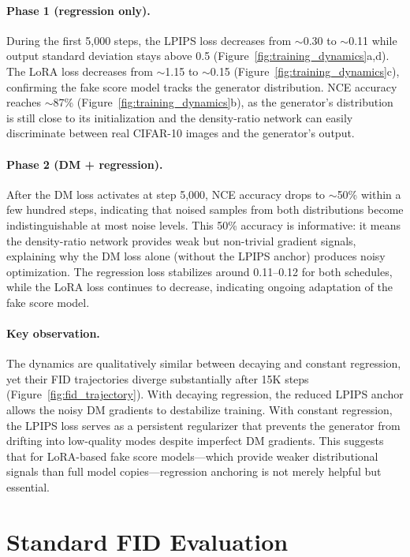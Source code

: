 \documentclass{article}
\theoremstyle{plain}
\theoremstyle{remark}
\begin{document}
\paragraph{Phase 1 (regression only).} During the first 5,000 steps, the LPIPS loss decreases from $\sim$0.30 to $\sim$0.11 while output standard deviation stays above 0.5 (Figure~\ref{fig:training_dynamics}a,d). The LoRA loss decreases from $\sim$1.15 to $\sim$0.15 (Figure~\ref{fig:training_dynamics}c), confirming the fake score model tracks the generator distribution. NCE accuracy reaches $\sim$87\% (Figure~\ref{fig:training_dynamics}b), as the generator's distribution is still close to its initialization and the density-ratio network can easily discriminate between real CIFAR-10 images and the generator's output.

\paragraph{Phase 2 (DM + regression).} After the DM loss activates at step 5,000, NCE accuracy drops to $\sim$50\% within a few hundred steps, indicating that noised samples from both distributions become indistinguishable at most noise levels. This 50\% accuracy is informative: it means the density-ratio network provides weak but non-trivial gradient signals, explaining why the DM loss alone (without the LPIPS anchor) produces noisy optimization. The regression loss stabilizes around 0.11--0.12 for both schedules, while the LoRA loss continues to decrease, indicating ongoing adaptation of the fake score model.

\paragraph{Key observation.} The dynamics are qualitatively similar between decaying and constant regression, yet their FID trajectories diverge substantially after 15K steps (Figure~\ref{fig:fid_trajectory}). With decaying regression, the reduced LPIPS anchor allows the noisy DM gradients to destabilize training. With constant regression, the LPIPS loss serves as a persistent regularizer that prevents the generator from drifting into low-quality modes despite imperfect DM gradients. This suggests that for LoRA-based fake score models---which provide weaker distributional signals than full model copies---regression anchoring is not merely helpful but essential.

\section{Standard FID Evaluation}
\label{app:standard_fid}
\end{document}
